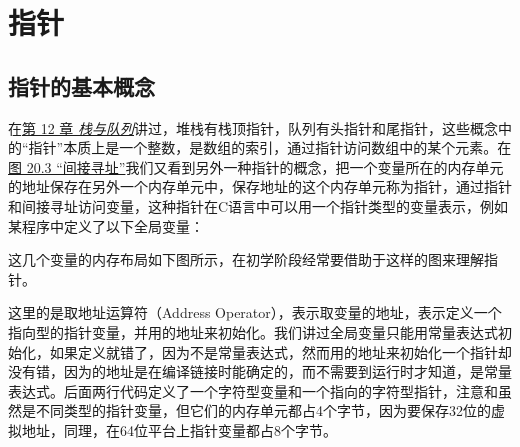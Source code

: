 

\chapter{指针}
%





\section{指针的基本概念}
%
在\hyperlink{db.ch12.id2749812}{第 12 章 \emph{栈与队列}}讲过，堆栈有栈顶指针，队列有头指针和尾指针，这些概念中的“指针”本质上是一个整数，是数组的索引，通过指针访问数组中的某个元素。在\hyperlink{db.ch20s04.id2790289}{图 20.\BookSplit{}3 “间接寻址”}我们又看到另外一种指针的概念，把一个变量所在的内存单元的地址保存在另外一个内存单元中，保存地址的这个内存单元称为指针，通过指针和间接寻址访问变量，这种指针在C语言中可以用一个指针类型的变量表示，例如某程序中定义了以下全局变量：




这几个变量的内存布局如下图所示，在初学阶段经常要借助于这样的图来理解指针。




这里的\BookCode{\&}是取地址运算符（Address Operator），表示取变量的地址，表示定义一个指向型的指针变量，并用的地址来初始化。我们讲过全局变量只能用常量表达式初始化，如果定义就错了，因为不是常量表达式，然而用的地址来初始化一个指针却没有错，因为的地址是在编译链接时能确定的，而不需要到运行时才知道，是常量表达式。后面两行代码定义了一个字符型变量和一个指向的字符型指针，注意和虽然是不同类型的指针变量，但它们的内存单元都占4个字节，因为要保存32位的虚拟地址，同理，在64位平台上指针变量都占8个字节。



